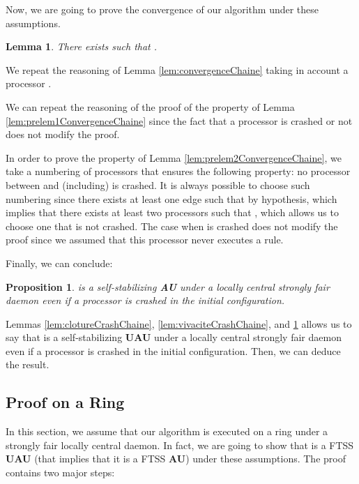 \documentclass[11pt,english,letterpaper]{article}
\newtheorem{lemma}{Lemma}
\newtheorem{proposition}{Proposition}
\newenvironment{proof}{{\noindent\bf Proof. } }{{\hfill }}
\begin{document}
Now, we are going to prove the convergence of our algorithm under these assumptions.

\begin{lemma}\label{lem:convergenceCrashChaine}
There exists  such that .
\end{lemma}

\begin{proof}
We repeat the reasoning of Lemma \ref{lem:convergenceChaine} taking in account a processor .

We can repeat the reasoning of the proof of the property of Lemma \ref{lem:prelem1ConvergenceChaine} since the fact that a processor is crashed or not does not modify the proof.

In order to prove the property of Lemma \ref{lem:prelem2ConvergenceChaine}, we take a numbering of processors that ensures the following property: no processor between  and  (including) is crashed. It is always possible to choose such numbering since there exists at least one edge  such that  by hypothesis, which implies that there exists at least two processors  such that , which allows us to choose one that is not crashed. The case when  is crashed does not modify the proof since we assumed that this processor never executes a rule.
\end{proof}

Finally, we can conclude:

\begin{proposition}\label{prop:SSCrashChaine}
 is a self-stabilizing \textbf{AU} under a locally central strongly fair daemon even if a processor is crashed in the initial configuration.
\end{proposition}

\begin{proof}
Lemmas \ref{lem:clotureCrashChaine}, \ref{lem:vivaciteCrashChaine}, and \ref{lem:convergenceCrashChaine} allows us to say that  is a self-stabilizing \textbf{UAU} under a locally central strongly fair daemon even if a processor is crashed in the initial configuration. Then, we can deduce the result.
\end{proof}
			
\subsection{Proof on a Ring}
  
In this section, we assume that our algorithm is executed on a ring under a strongly fair locally central daemon. In fact, we are going to show that  is a FTSS \textbf{UAU} (that implies that it is a FTSS \textbf{AU}) under these assumptions. The proof contains two major steps:
\end{document}

